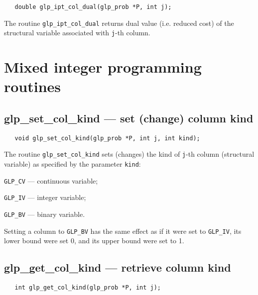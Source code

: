 \synopsis

\begin{verbatim}
   double glp_ipt_col_dual(glp_prob *P, int j);
\end{verbatim}

\returns

The routine \verb|glp_ipt_col_dual| returns dual value (i.e. reduced
cost) of the structural variable associated with \verb|j|-th column.


\newpage

\section{Mixed integer programming routines}

\subsection{glp\_set\_col\_kind --- set (change) column kind}

\synopsis

\begin{verbatim}
   void glp_set_col_kind(glp_prob *P, int j, int kind);
\end{verbatim}

\description

The routine \verb|glp_set_col_kind| sets (changes) the kind of
\verb|j|-th column (structural variable) as specified by the parameter
\verb|kind|:

\verb|GLP_CV| --- continuous variable;

\verb|GLP_IV| --- integer variable;

\verb|GLP_BV| --- binary variable.

Setting a column to \verb|GLP_BV| has the same effect as if it were
set to \verb|GLP_IV|, its lower bound were set 0, and its upper bound
were set to 1.

\subsection{glp\_get\_col\_kind --- retrieve column kind}

\synopsis

\begin{verbatim}
   int glp_get_col_kind(glp_prob *P, int j);
\end{verbatim}

\returns

